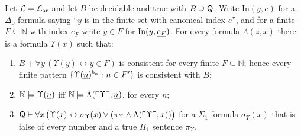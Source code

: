 \begin{lemma}\label{lem:logic:flexible}
Let $\mathcal L=\mathcal{L}_{\mathrm{ar}}$ and let $B$ be decidable and true with $B\supseteq\mathsf{Q}$. Write $\mathrm{In}(y,e)$ for a $\Delta_0$ formula saying ``$y$ is in the finite set with canonical index $e$'', and for a finite $F\subseteq\mathbb N$ with index $e_F$ write $y\in F$ for $\mathrm{In}(y,\underline{e_F})$. For every formula $\Lambda(z,x)$ there is a formula $\Upsilon(x)$ such that:
\begin{enumerate}[label=(\roman*),leftmargin=*]
\item $B+\forall y\,(\Upsilon(y)\leftrightarrow y\in F)$ is consistent for every finite $F\subseteq\mathbb N$; hence every finite pattern $\{\Upsilon(\underline{n})^{b_n}:n\in F'\}$ is consistent with $B$;
\item $\mathbb N\models\Upsilon(\underline{n})$ iff $\mathbb N\models\Lambda(\ulcorner \Upsilon\urcorner,\underline{n})$, for every $n$;
\item $\mathsf{Q}\vdash\forall x\,\big(\Upsilon(x)\leftrightarrow\sigma_\Upsilon(x)\vee(\pi_\Upsilon\wedge\Lambda(\ulcorner \Upsilon\urcorner,x))\big)$ for a $\Sigma_1$ formula $\sigma_\Upsilon(x)$ that is false of every number and a true $\Pi_1$ sentence $\pi_\Upsilon$.
\end{enumerate}
\end{lemma}

